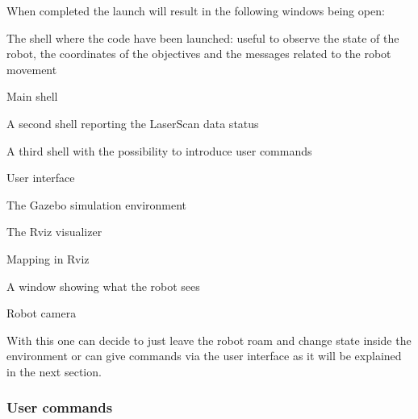 When completed the launch will result in the following windows being open\+:
\begin{DoxyItemize}
\item The shell where the code have been launched\+: useful to observe the state of the robot, the coordinates of the objectives and the messages related to the robot movement  
\end{DoxyItemize}

Main shell 


\begin{DoxyItemize}
\item A second shell reporting the Laser\+Scan data status
\item A third shell with the possibility to introduce user commands  
\end{DoxyItemize}

User interface 


\begin{DoxyItemize}
\item The Gazebo simulation environment
\item The Rviz visualizer  
\end{DoxyItemize}

Mapping in Rviz 


\begin{DoxyItemize}
\item A window showing what the robot sees  
\end{DoxyItemize}

Robot camera 

With this one can decide to just leave the robot roam and change state inside the environment or can give commands via the user interface as it will be explained in the next section.

\subsubsection*{User commands}


